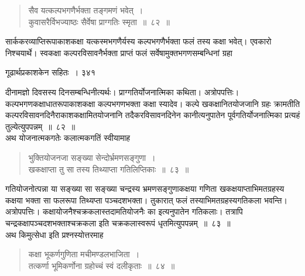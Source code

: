 \documentclass[11pt, openany]{book}
\begin{document}

\begin{quote}
 {\ssi सैव यत्कल्पभगणैर्भक्ता तङ्गमणं भवेत्~।\\
कुवासरैर्विभज्याष्ठः सैर्वेषा प्राग्गतिः स्मृता~॥~८२~॥}
\end{quote}

 सार्ककरव्याप्तिरूपाकाशकक्षा यत्कस्मभगणैर्यस्य कल्पभगणैर्भक्ता फलं तस्य कक्षा भवेत्। एवकारो निश्चयार्थे। स्वकक्षा कल्परविसावनैर्भक्ता प्राप्तं फलं सर्वेषामुक्तभगणसम्बन्धिनां ग्रहा\textendash



\newpage


\hspace{3cm} गूढार्थप्रकाशकेन सहितः~। \hfill ३४१
\vspace{1cm}


\noindent दीनामज्ञो दिवसस्य दिनसम्बन्धिनीत्यर्थः। प्राग्गतिर्योजनात्मिका कथिता। अत्रोपपत्तिः। कल्पभगणकक्षाधातरूपाकाशकक्षा कल्पभगणभक्ता कक्षा स्यादेव। कल्पे खकक्षानितयोजजानि ग्रहः क्रामतीति कल्परविसावनदिनैराकाशकक्षामितयोजनानि तदैकरविसावनदिनेन कानीत्यनुपातेन पूर्वगतिर्योजनात्मिका प्रत्यहं तुल्येत्युपपन्नम्~॥~८२~॥ \\
\noindent अथ योजनात्मकगतेः कलात्मकगतिं स्वीयामाह \textendash 


\begin{quote}
{\ssi भुक्तियोजनजा सङ्ख्या सेन्दोर्भ्रमणसङ्गुणा~।\\
खकक्षाप्ता तु सा तस्य तिथ्याप्ता गतिलिप्तिकाः~॥~८३~॥ }
\end{quote}
 गतियोजनोत्पन्ना या सङ्ख्या सा सङ्ख्या चन्द्रस्य भ्रमणसङ्गुणाकक्षया गणिता खकक्षयाप्ताभिमतग्रहस्य कक्षया भक्ता सा फलरूपा तिथ्यप्ता पञ्चदशभक्ता। तुकारात् फलं तस्याभिमतग्रहस्यगतिकला भवन्ति। अत्रोपपत्तिः। कक्षायोजनैश्चक्रकलास्तदामतियोजनैः का इत्यनुपातेन गतिकलाः। तत्रापि चन्द्रकक्षापञ्चदशभक्ताश्चक्रकला इति चक्रकलास्वरूपं धृतमित्युपपन्नम्~॥~८३~॥ \\
\noindent अथ किमुत्सेधा इति प्रश्नस्योत्तरमाह \textendash


\begin{quote}
{\ssi कक्षा भूकर्णगुणिता मचीमण्डलभाजिता~।\\
तत्कर्णा भूमिकर्णोना ग्रहोच्चं स्वं दलीकृताः~॥~८४~॥}
\end{quote}
\end{document}

